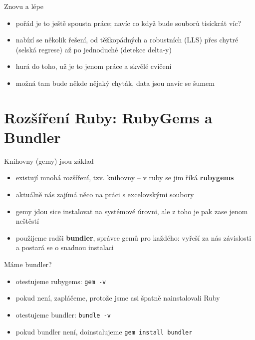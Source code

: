 \documentclass{beamer}
\begin{document}
\begin{frame}{Znovu a lépe}
  \begin{itemize}
    \item pořád je to ještě spousta práce; navíc co když bude souborů tisíckrát víc?
    \item nabízí se několik řešení, od těžkopádných a robustních (LLS) přes chytré (selská regrese) až po jednoduché (detekce delta-y)
    \item hurá do toho, už je to jenom práce a skvělé cvičení
    \item možná tam bude někde nějaký chyták, data jsou navíc se šumem
  \end{itemize}
\end{frame}

\section{Rozšíření Ruby: RubyGems a Bundler}

\begin{frame}{Knihovny (gemy) jsou základ}
  \begin{itemize}
    \item existují mnohá rozšíření, tzv. knihovny -- v ruby se jim říká \textbf{rubygems}
    \item aktuálně nás zajímá něco na práci s excelovskými soubory
    \item gemy jdou sice instalovat na systémové úrovni, ale z toho je pak zase jenom neštěstí
    \item použijeme radši \textbf{bundler}, správce gemů pro každého: vyřeší za nás závislosti a postará se o snadnou instalaci
  \end{itemize}
\end{frame}

\begin{frame}{Máme bundler?}
  \begin{itemize}
    \item otestujeme rubygems: \texttt{gem -v}
    \item pokud není, zapláčeme, protože jsme asi špatně nainstalovali Ruby
    \item otestujeme bundler: \texttt{bundle -v}
    \item pokud bundler není, doinstalujeme \texttt{gem install bundler}
  \end{itemize}
\end{frame}
\end{document}
